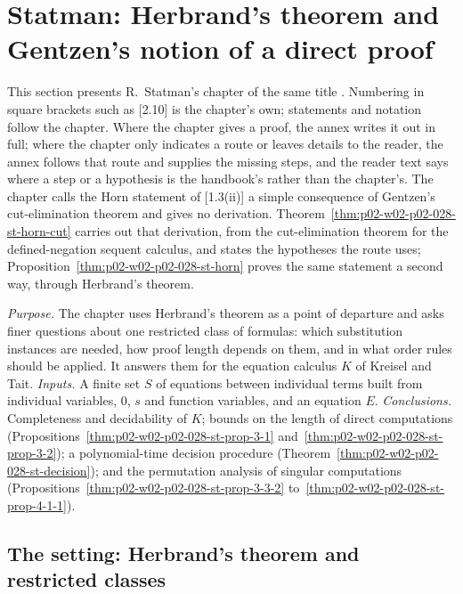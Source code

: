 \section{Statman: Herbrand's theorem and Gentzen's notion of a direct proof}
\label{sec:p02-w02-p02-028-statman}

This section presents R.~Statman's chapter of the same title
\cite[pp.~897--912]{Statman1977}.  Numbering in square brackets such as
[2.10] is the chapter's own; statements and notation follow the chapter.
Where the chapter gives a proof, the annex writes it out in full; where the
chapter only indicates a route or leaves details to the reader, the annex
follows that route and supplies the missing steps, and the reader text says
where a step or a hypothesis is the handbook's rather than the chapter's.
The chapter calls the Horn statement of [1.3(ii)] a simple consequence of
Gentzen's cut-elimination theorem and gives no derivation.
Theorem~\ref{thm:p02-w02-p02-028-st-horn-cut} carries out that derivation,
from the cut-elimination theorem for the defined-negation sequent calculus,
and states the hypotheses the route uses; Proposition~\ref{thm:p02-w02-p02-028-st-horn}
proves the same statement a second way, through Herbrand's theorem.

\emph{Purpose.}  The chapter uses Herbrand's theorem as a point of departure
and asks finer questions about one restricted class of formulas: which
substitution instances are needed, how proof length depends on them, and in
what order rules should be applied.  It answers them for the equation
calculus \(K\) of Kreisel and Tait.
\emph{Inputs.}  A finite set \(S\) of equations between individual terms
built from individual variables, \(0\), \(s\) and function variables, and an
equation \(E\).
\emph{Conclusions.}  Completeness and decidability of \(K\); bounds on the
length of direct computations
(Propositions~\ref{thm:p02-w02-p02-028-st-prop-3-1}
and~\ref{thm:p02-w02-p02-028-st-prop-3-2}); a polynomial-time decision
procedure (Theorem~\ref{thm:p02-w02-p02-028-st-decision}); and the
permutation analysis of singular computations
(Propositions~\ref{thm:p02-w02-p02-028-st-prop-3-3-2}
to~\ref{thm:p02-w02-p02-028-st-prop-4-1-1}).

\subsection{The setting: Herbrand's theorem and restricted classes}
\label{sec:p02-w02-p02-028-st-setting}

